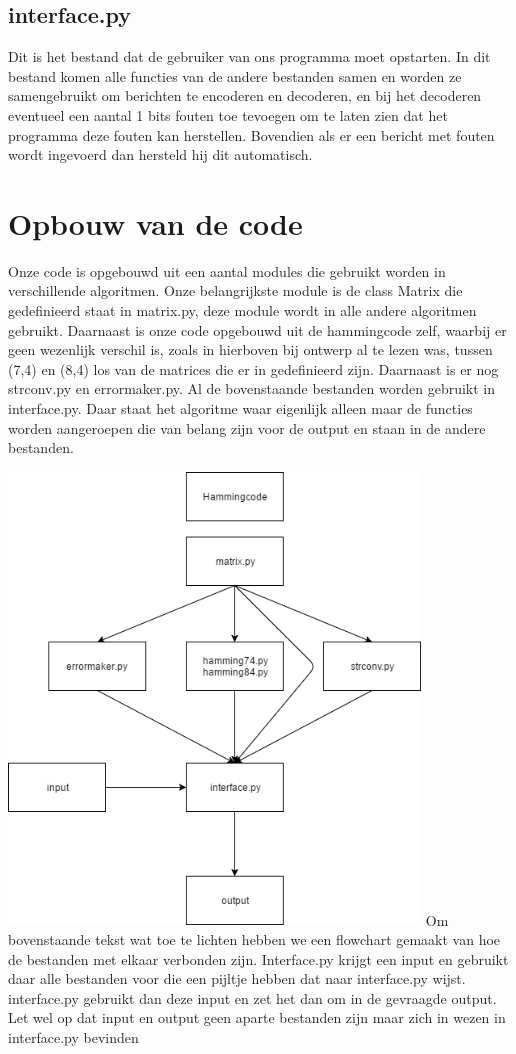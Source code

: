 \documentclass[a4paper]{article}
\begin{document}
\subsection{interface.py}
	Dit is het bestand dat de gebruiker van ons programma moet opstarten. In dit bestand komen alle functies van de andere bestanden samen en worden ze samengebruikt om berichten te encoderen en decoderen, en bij het decoderen eventueel een aantal 1 bits fouten toe tevoegen om te laten zien dat het programma deze fouten kan herstellen. Bovendien als er een bericht met fouten wordt ingevoerd dan hersteld hij dit automatisch.
	
\section{Opbouw van de code}
Onze code is opgebouwd uit een aantal modules die gebruikt worden in verschillende algoritmen. Onze belangrijkste module is de class Matrix die gedefinieerd staat in matrix.py, deze module wordt in alle andere algoritmen gebruikt. Daarnaast is onze code opgebouwd uit de hammingcode zelf, waarbij er geen wezenlijk verschil is, zoals in hierboven bij ontwerp al te lezen was, tussen (7,4) en (8,4) los van de matrices die er in gedefinieerd zijn. Daarnaast is er nog strconv.py en errormaker.py. Al de bovenstaande bestanden worden gebruikt in interface.py. Daar staat het algoritme waar eigenlijk alleen maar de functies worden aangeroepen die van belang zijn voor de output en staan in de andere bestanden.

\includegraphics[height=12cm]{diagram}
Om bovenstaande tekst wat toe te lichten hebben we een flowchart gemaakt van hoe de bestanden met elkaar verbonden zijn. Interface.py krijgt een input en gebruikt daar alle bestanden voor die een pijltje hebben dat naar interface.py wijst. interface.py gebruikt dan deze input en zet het dan om in de gevraagde output. Let wel op dat input en output geen aparte bestanden zijn maar zich in wezen in interface.py bevinden
\end{document}

